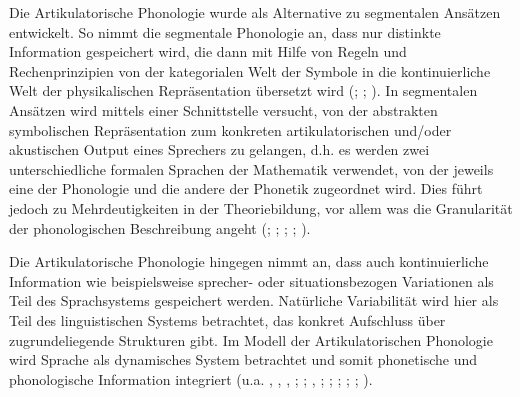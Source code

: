 \label{chap:00}
Die Artikulatorische Phonologie wurde als Alternative zu segmentalen Ansätzen entwickelt. So nimmt die segmentale Phonologie an, dass nur distinkte Information gespeichert wird, die dann mit Hilfe von Regeln und Rechenprinzipien von der kategorialen Welt der Symbole in die kontinuierliche Welt der physikalischen Repräsentation übersetzt wird (\citealt{Ohala1990}; \citealt[][2]{Gafos2006}; \citealt{Mücke2016}).
In segmentalen Ansätzen wird mittels einer Schnittstelle versucht, von der abstrakten symbolischen Repräsentation zum konkreten artikulatorischen und/oder akustischen Output eines Sprechers zu gelangen, d.h. es werden zwei unterschiedliche formalen Sprachen der Mathematik verwendet, von der jeweils eine der Phonologie und die andere der Phonetik zugeordnet wird. Dies führt jedoch zu Mehrdeutigkeiten in der Theoriebildung, vor allem was die Granularität der phonologischen Beschreibung angeht (\citealt{Trubeckoj1939}; \citealt{DeSaussure1916}; \citealt{Rischel1990}; \citealt{Pierrehumbert1990}; \citealt[][321]{Keating1990a}). 

Die Artikulatorische Phonologie hingegen nimmt an, dass auch kontinuierliche Information wie beispielsweise sprecher- oder situationsbezogen Variationen als Teil des Sprachsystems gespeichert werden. Natürliche Variabilität wird hier als Teil des linguistischen Systems betrachtet, das konkret Aufschluss über zugrundeliegende Strukturen gibt. Im Modell der Artikulatorischen Phonologie wird Sprache als dynamisches System betrachtet und somit phonetische und phonologische Information integriert (u.a. \citealt{Browman1986}, \citealt{Browman1988}, \citealt{Browman1991a}, \citealt{Fowler1977}; \citealt{Fowler1980}; \citealt{Saltzman1986}, \citealt{Browman1986}; \citealt{Saltzman1987};  \citealt{Kugler1987}; \citealt{Saltzman1989}; \citealt{Kelso1995}; \citealt{Gafos2006}). 

